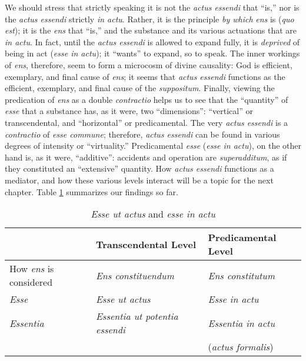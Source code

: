 We should stress that strictly speaking it is not the \emph{actus essendi} that ``is,'' nor is the \emph{actus essendi} strictly \emph{in actu}. Rather, it is the principle \emph{by which} \emph{ens} is (\emph{quo est}); it is the \emph{ens} that ``is,'' and the substance and its various actuations that are \emph{in actu}. In fact, until the \emph{actus essendi} is allowed to expand fully, it is \emph{deprived} of being in act (\emph{esse in actu}); it ``wants'' to expand, so to speak. The inner workings of \emph{ens}, therefore, seem to form a microcosm of divine causality: God is efficient, exemplary, and final cause of \emph{ens}; it seems that \emph{actus essendi} functions as the efficient, exemplary, and final cause of the \emph{suppositum}. Finally, viewing the predication of \emph{ens} as a double \emph{contractio} helps us to see that the ``quantity'' of \emph{esse} that a substance has, as it were, two ``dimensions'': ``vertical'' or transcendental, and ``horizontal'' or predicamental. The very \emph{actus essendi} is a \emph{contractio} of \emph{esse commune}; therefore, \emph{actus essendi} can be found in various degrees of intensity or ``virtuality.'' Predicamental \emph{esse} (\emph{esse in actu}), on the other hand is, as it were, ``additive'': accidents and operation are \emph{superadditum}, as if they constituted an ``extensive'' quantity. How \emph{actus essendi} functions as a mediator, and how these various levels interact will be a topic for the next chapter. Table \ref{tab:esse-ut-actus-in-actu} summarizes our findings so far.

\begin{table}
  \centering
    \begin{tabular}{lll}
      \toprule
        \rule[-6pt]{0pt}{22pt}&
        \textbf{Transcendental Level} &
        \textbf{Predicamental Level} \\
      \midrule
        \rule[-6pt]{0pt}{22pt}How \emph{ens} is considered &
        \emph{Ens constituendum} &
        \emph{Ens constitutum} \\
        \rule[-6pt]{0pt}{22pt}\emph{Esse} &
        \emph{Esse ut actus} &
        \emph{Esse in actu} \\
        \rule{0pt}{16pt}\emph{Essentia} &
        \emph{Essentia ut potentia essendi} &
        \emph{Essentia in actu} \\
        \rule[-6pt]{0pt}{6pt}&
        &
        (\emph{actus formalis}) \\

      \bottomrule
    \end{tabular}%
    \caption{\emph{Esse ut actus} and \emph{esse in actu}}
  \label{tab:esse-ut-actus-in-actu}%
\end{table}%


